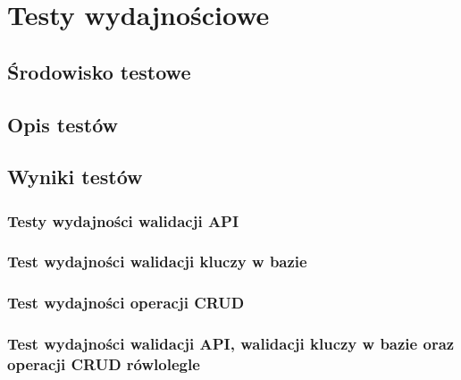 \chapter{Testy wydajnościowe}
\section{Środowisko testowe}
\section{Opis testów}
\section{Wyniki testów}

\subsection{Testy wydajności walidacji API}


\subsection{Test wydajności walidacji kluczy w bazie}

\subsection{Test wydajności operacji CRUD}

\subsection{Test wydajności walidacji API, walidacji kluczy w bazie oraz operacji CRUD rówlolegle }


% 

% 
% 

